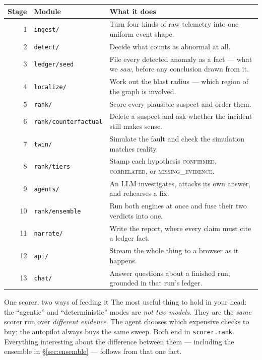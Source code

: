 \documentclass[11pt,a4paper]{article}
\newcommand{\code}[1]{\texttt{\small #1}}
\begin{document}
\begin{center}
\footnotesize
\begin{tabular}{@{}r@{\ \ }l@{\ \ }p{9.4cm}@{}}
\toprule
\textbf{Stage} & \textbf{Module} & \textbf{What it does} \\
\midrule
1 & \code{ingest/}    & Turn four kinds of raw telemetry into one uniform event shape. \\
2 & \code{detect/}    & Decide what counts as abnormal at all. \\
3 & \code{ledger/seed} & File every detected anomaly as a fact --- what we \emph{saw}, before any conclusion drawn from it. \\
4 & \code{localize/}  & Work out the blast radius --- which region of the graph is involved. \\
5 & \code{rank/}      & Score every plausible suspect and order them. \\
6 & \code{rank/counterfactual} & Delete a suspect and ask whether the incident still makes sense. \\
7 & \code{twin/}      & Simulate the fault and check the simulation matches reality. \\
8 & \code{rank/tiers} & Stamp each hypothesis \textsc{confirmed}, \textsc{correlated}, or \textsc{missing\_evidence}. \\
9 & \code{agents/}    & An LLM investigates, attacks its own answer, and rehearses a fix. \\
10 & \code{rank/ensemble} & Run both engines at once and fuse their two verdicts into one. \\
11 & \code{narrate/}   & Write the report, where every claim must cite a ledger fact. \\
12 & \code{api/}      & Stream the whole thing to a browser as it happens. \\
13 & \code{chat/}     & Answer questions about a finished run, grounded in that run's ledger. \\
\bottomrule
\end{tabular}
\end{center}

\begin{keybox}{One scorer, two ways of feeding it}
The most useful thing to hold in your head: the ``agentic'' and ``deterministic''
modes are \emph{not two models}. They are the \emph{same} scorer run over
\emph{different evidence}. The agent chooses which expensive checks to buy; the
autopilot always buys the same sweep. Both end in \code{scorer.rank}. Everything
interesting about the difference between them --- including the ensemble in
\S\ref{sec:ensemble} --- follows from that one fact.
\end{keybox}
\end{document}
